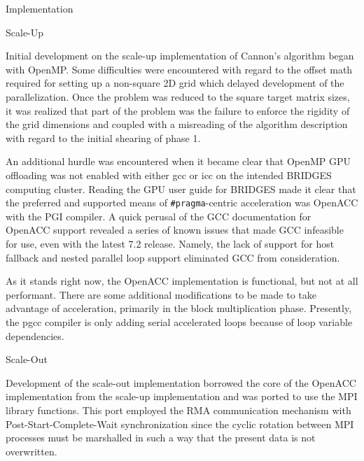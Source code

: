 \documentclass{article}
\begin{document}
\begin{section}{Implementation}
  \begin{subsection}{Scale-Up}
    \begin{paragraph}{}
      Initial development on the scale-up implementation of Cannon's algorithm began with OpenMP. Some difficulties were encountered with regard
      to the offset math required for setting up a non-square 2D grid which delayed development of the parallelization. Once the problem was
      reduced to the square target matrix sizes, it was realized that part of the problem was the failure to enforce the rigidity of the grid dimensions
      and coupled with a misreading of the algorithm description with regard to the initial shearing of phase 1.
    \end{paragraph}
    \begin{paragraph}{}
      An additional hurdle was encountered when it became clear that OpenMP GPU offloading was not enabled with either gcc or icc on the intended
      BRIDGES computing cluster. Reading the GPU user guide for BRIDGES\autocite{BridgesGPUGuide} made it clear that the preferred and supported means of \texttt{\#pragma}-centric
      acceleration was OpenACC with the PGI compiler. A quick perusal of the GCC documentation for OpenACC support\autocite{gccOpenACC} revealed a series
      of known issues that made GCC infeasible for use, even with the latest 7.2 release. Namely, the lack of support for host fallback and nested
      parallel loop support eliminated GCC from consideration.
    \end{paragraph}
    \begin{paragraph}
      As it stands right now, the OpenACC implementation is functional, but not at all performant. There are some additional modifications to be made
      to take advantage of acceleration, primarily in the block multiplication phase. Presently, the pgcc compiler is only adding serial accelerated
      loops because of loop variable dependencies.
    \end{paragraph}
  \end{subsection}
  \begin{subsection}{Scale-Out}
    \begin{paragraph}{}
      Development of the scale-out implementation borrowed the core of the OpenACC implementation from the scale-up implementation and was ported
      to use the MPI library functions. This port employed the RMA communication mechanism with Post-Start-Complete-Wait synchronization since
      the cyclic rotation between MPI processes must be marshalled in such a way that the present data is not overwritten.

\end{paragraph}
\end{subsection}
\end{section}
\end{document}
